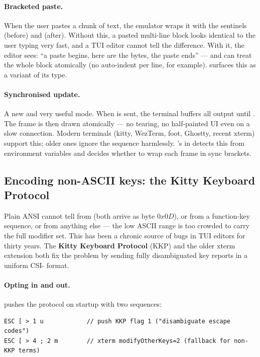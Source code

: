 \paragraph{Bracketed paste.}
When the user pastes a chunk of text, the emulator wraps it with the
sentinels \code{ESC [ 200 \~{}} (before) and \code{ESC [ 201 \~{}}
(after). Without this, a pasted multi-line block looks identical to
the user typing very fast, and a TUI editor cannot tell the
difference. With it, the editor sees: ``a paste begins, here are the
bytes, the paste ends'' --- and can treat the whole block atomically
(no auto-indent per line, for example). \maya{} surfaces this as a
 variant of its  type.

\paragraph{Synchronised update.}
A new and very useful mode. When  is sent, the terminal
buffers all output until . The frame is then drawn
atomically --- no tearing, no half-painted UI even on a slow connection.
Modern terminals (kitty, WezTerm, foot, Ghostty, recent xterm)
support this; older ones ignore the sequence harmlessly. \maya{}'s
 in
 detects this from environment variables and
decides whether to wrap each frame in sync brackets.

\subsection{Encoding non-ASCII keys: the Kitty Keyboard Protocol}

Plain ANSI cannot tell  from  (both arrive
as byte $0x0D$), or  from a function-key sequence,
or  from anything else --- the low ASCII range is too
crowded to carry the full modifier set. This has been a chronic
source of bugs in TUI editors for thirty years. The \textbf{Kitty
Keyboard Protocol} (KKP) and the older xterm 
extension both fix the problem by sending fully disambiguated key
reports in a uniform CSI- format.

\paragraph{Opting in and out.}
\maya{} pushes the protocol on startup with two sequences:

\begin{lstlisting}
ESC [ > 1 u            // push KKP flag 1 ("disambiguate escape codes")
ESC [ > 4 ; 2 m        // xterm modifyOtherKeys=2 (fallback for non-KKP terms)
\end{lstlisting}

